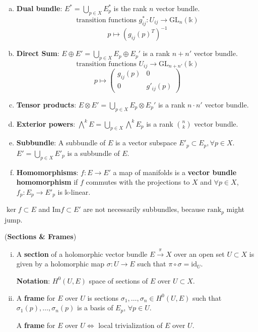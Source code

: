 \documentclass{article}
\begin{document}
\begin{enumerate}[(a)]
    \item \textbf{Dual bundle}: $E^* = \bigcup_{p \in X} E_p^*$ is the rank $n$ vector bundle.
    $$ \text{transition functions } g_{ij}^*: U_{ij} \to \mathrm{GL}_n(\mathbb{k}) $$
    $$ p \mapsto (g_{ij}(p)^T)^{-1} $$
    \item \textbf{Direct Sum}: $E \oplus E' = \bigcup_{p \in X} E_p \oplus E_p'$ is a rank $n+n'$ vector bundle.
    $$ \text{transition functions } U_{ij} \to \mathrm{GL}_{n+n'}(\mathbb{k}) $$
    $$ p \mapsto \begin{pmatrix} g_{ij}(p) & 0 \\ 0 & g'_{ij}(p) \end{pmatrix} $$
    \item \textbf{Tensor products}: $E \otimes E' = \bigcup_{p \in X} E_p \otimes E_p'$ is a rank $n \cdot n'$ vector bundle.
    \item \textbf{Exterior powers}: $\bigwedge^k E = \bigcup_{p \in X} \bigwedge^k E_p$ is a rank $\binom{n}{k}$ vector bundle.
    \item \textbf{Subbundle}: A subbundle of $E$ is a vector subspace $E'_p \subset E_p, \forall p \in X$. $E' = \bigcup_{p \in X} E'_p$ is a subbundle of $E$.
    \item \textbf{Homomorphisms}: $f: E \to E'$ a map of manifolds is a \textbf{vector bundle homomorphism} if $f$ commutes with the projections to $X$ and $\forall p \in X$, $f_p: E_p \to E'_p$ is $\mathbb{k}$-linear.
\end{enumerate}

\begin{remark}
$\ker f \subset E$ and $\mathrm{Im} f \subset E'$ are not necessarily subbundles, because $\mathrm{rank}_p$ might jump.
\end{remark}

\begin{definition} (\textbf{Sections \& Frames})
\begin{enumerate}[(i)]
    \item A \textbf{section} of a holomorphic vector bundle $E \xrightarrow{\pi} X$ over an open set $U \subset X$ is given by a holomorphic map $\sigma: U \to E$ such that $\pi \circ \sigma = \mathrm{id}_U$.
    
    \textbf{Notation}: $H^0(U, E)$ space of sections of $E$ over $U \subset X$.
    \item A \textbf{frame} for $E$ over $U$ is sections $\sigma_1, \dots, \sigma_n \in H^0(U, E)$ such that $\sigma_1(p), \dots, \sigma_n(p)$ is a basis of $E_p$, $\forall p \in U$.
    
    A \textbf{frame} for $E$ over $U \iff$ local trivialization of $E$ over $U$.
\end{enumerate}
\end{definition}
\end{document}
